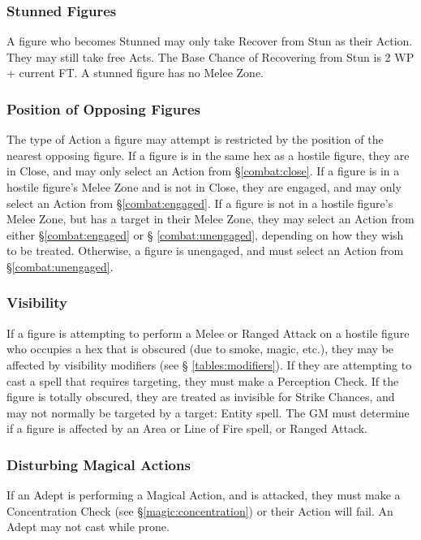 \begin{multicols*}{3}
\subsubsection{Stunned Figures}
\label{combat:stun}

A figure who becomes Stunned may only take Recover from Stun as their
Action.  They may still take free Acts.  The Base Chance of Recovering
from Stun is 2 \x WP + current FT.  A stunned figure has no Melee
Zone.

\subsubsection{Position of Opposing Figures}

The type of Action a figure may attempt is restricted by the position
of the nearest opposing figure. If a figure is in the same hex as a
hostile figure, they are in Close, and may only select an Action from
\S \ref{combat:close}. If a figure is in a hostile figure's Melee Zone
and is not in Close, they are engaged, and may only select an Action
from \S \ref{combat:engaged}. If a figure is not in a hostile figure's
Melee Zone, but has a target in their Melee Zone, they may select an
Action from either \S \ref{combat:engaged} or \S
\ref{combat:unengaged}, depending on how they wish to be
treated. Otherwise, a figure is unengaged, and must select an Action
from \S \ref{combat:unengaged}.

\subsubsection{Visibility}

If a figure is attempting to perform a Melee or Ranged Attack on a
hostile figure who occupies a hex that is obscured (due to smoke,
magic, etc.), they may be affected by visibility modifiers (see \S
\ref{tables:modifiers}). If they are attempting to cast a spell that
requires targeting, they must make a Perception Check. If the figure
is totally obscured, they are treated as invisible for Strike Chances,
and may not normally be targeted by a target: Entity spell. The GM
must determine if a figure is affected by an Area or Line of Fire
spell, or Ranged Attack.

\subsubsection{Disturbing Magical Actions}

If an Adept is performing a Magical Action, and is attacked, they must
make a Concentration Check (see \S \ref{magic:concentration}) or their
Action will fail.  An Adept may not cast while prone.


\end{multicols*}
